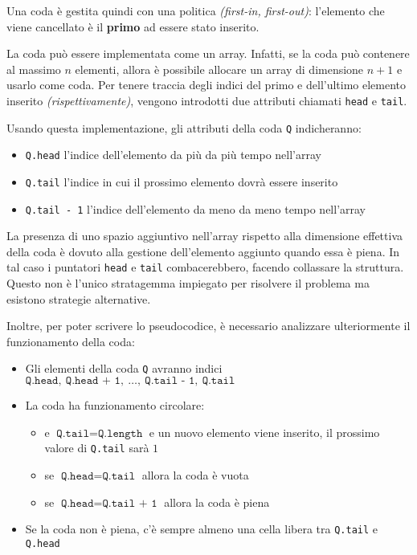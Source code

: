\documentclass[italian, 10pt]{article}
\begin{document}
Una coda è gestita quindi con una politica \FIFO \textit{(first-in, first-out)}: l'elemento che viene cancellato è il \textbf{primo} ad essere stato inserito.

\bigskip
La coda può essere implementata come un array.
Infatti, se la coda può contenere al massimo \(n\) elementi, allora è possibile allocare un array di dimensione \(n+1\) e usarlo come coda.
Per tenere traccia degli indici del primo e dell'ultimo elemento inserito \textit{(rispettivamente)}, vengono introdotti due attributi chiamati \texttt{head} e \texttt{tail}.

Usando questa implementazione, gli attributi della coda \texttt{Q} indicheranno:

\begin{itemize}
  \item \texttt{Q.head} l'indice dell'elemento da più da più tempo nell'array
  \item \texttt{Q.tail} l'indice in cui il prossimo elemento dovrà essere inserito
  \item \texttt{Q.tail - 1} l'indice dell'elemento da meno da meno tempo nell'array
\end{itemize}

La presenza di uno spazio aggiuntivo nell'array rispetto alla dimensione effettiva della coda è dovuto alla gestione dell'elemento aggiunto quando essa è piena.
In tal caso i puntatori \texttt{head} e \texttt{tail} combacerebbero, facendo collassare la struttura.
Questo non è l'unico stratagemma impiegato per risolvere il problema ma esistono strategie alternative.

\bigskip
Inoltre, per poter scrivere lo pseudocodice, è necessario analizzare ulteriormente il funzionamento della coda:

\begin{itemize}
  \item Gli elementi della coda \texttt{Q} avranno indici \(\texttt{Q.head},\ \texttt{Q.head + 1},\ \ldots,\ \texttt{Q.tail - 1},\ \texttt{Q.tail}\)
  \item La coda ha funzionamento circolare:
        \begin{itemize}
          \item e \(\texttt{Q.tail} = \texttt{Q.length}\) e un nuovo elemento viene inserito, il prossimo valore di \texttt{Q.tail} sarà \(1\)
          \item se \(\texttt{Q.head} = \texttt{Q.tail}\) allora la coda è vuota
          \item se \(\texttt{Q.head} = \texttt{Q.tail + 1}\) allora la coda è piena
        \end{itemize}
  \item Se la coda non è piena, c'è sempre almeno una cella libera tra \texttt{Q.tail} e \texttt{Q.head}
\end{itemize}
\end{document}
